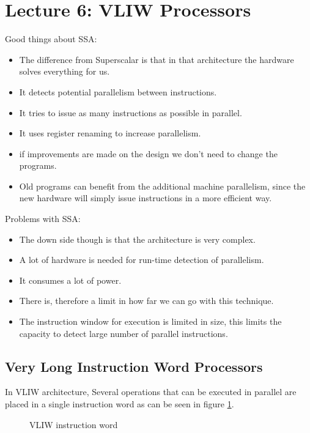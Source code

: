 \section{Lecture 6: VLIW Processors}
Good things about SSA:
\begin{itemize}
\item The difference from Superscalar is that in that architecture the hardware solves everything for us.
\item It detects potential parallelism between instructions.
\item It tries to issue as many instructions as possible in parallel.
\item It uses register renaming to increase parallelism.
\item if improvements are made on the design we don't need to change the programs.
\item Old programs can benefit from the additional machine parallelism, since the new hardware will simply issue instructions in a more efficient way.
\end{itemize}

Problems with SSA:
\begin{itemize}
\item The down side though is that the architecture is very complex.
\item A lot of hardware is needed for run-time detection of parallelism.
\item It consumes a lot of power.
\item There is, therefore a limit in how far we can go with this technique.
\item The instruction window for execution is limited in size, this limits the capacity to detect large number of parallel instructions.
\end{itemize}

\subsection{Very Long Instruction Word Processors}
In VLIW architecture, Several operations that can be executed in parallel are placed in a single instruction word as can be seen in figure \ref{fig:vliw-instr}.

\begin{figure}[H]
  \centering
  \caption{VLIW instruction word}
  \label{fig:vliw-instr}
\end{figure}

